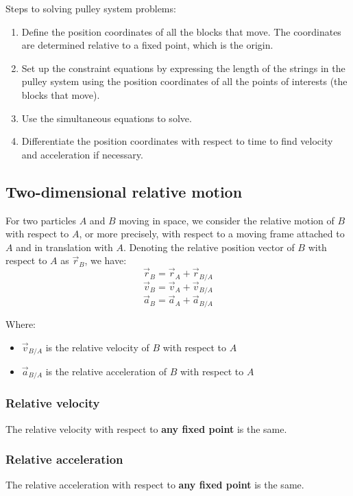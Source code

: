 \documentclass[11pt]{article}
\begin{document}
Steps to solving pulley system problems:
\begin{enumerate}
\item Define the position coordinates of all the blocks that move. The coordinates are determined relative to a fixed point, which is the origin.
\item Set up the constraint equations by expressing the length of the strings in the pulley system using the position coordinates of all the points of interests (the blocks that move).
\item Use the simultaneous equations to solve.
\item Differentiate the position coordinates with respect to time to find velocity and acceleration if necessary.
\end{enumerate}
\subsection{Two-dimensional relative motion}
\label{sec:org480c1ed}
For two particles \(A\) and \(B\) moving in space, we consider the relative motion of \(B\) with respect to \(A\), or more precisely, with respect to a moving frame attached to \(A\) and in translation with \(A\). Denoting the relative position vector of \(B\) with respect to \(A\) as \(\vec{r}_B\), we have:
\[\vec{r}_B = \vec{r}_A + \vec{r}_{B/A}\]
\[\vec{v}_B = \vec{v}_A + \vec{v}_{B/A}\]
\[\vec{a}_B = \vec{a}_A + \vec{a}_{B/A}\]

Where:
\begin{itemize}
\item \(\vec{v}_{B/A}\) is the relative velocity of \(B\) with respect to \(A\)
\item \(\vec{a}_{B/A}\) is the relative acceleration of \(B\) with respect to \(A\)
\end{itemize}
\subsubsection{Relative velocity}
\label{sec:org14633cf}
The relative velocity with respect to \textbf{any fixed point} is the same.
\subsubsection{Relative acceleration}
\label{sec:org35f971e}
The relative acceleration with respect to \textbf{any fixed point} is the same.

 \newpage
\end{document}
